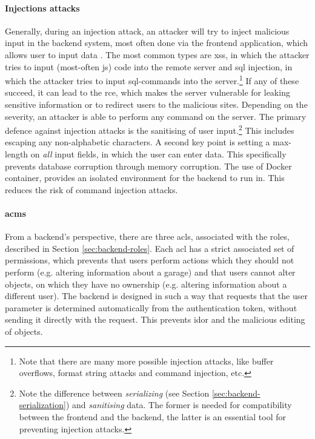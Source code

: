 \paragraph{Injections attacks}
Generally, during an injection attack, an attacker will try to inject malicious input in the backend system, most often done via the frontend application, which allows user to input data \cite{injection_attacks}. The most common types are \ac{xss}, in which the attacker tries to input (most-often \ac{js}) code into the remote server and \ac{sql} injection, in which the attacker tries to input \ac{sql}-commands into the server.\footnote{Note that there are many more possible injection attacks, like buffer overflows, format string attacks and command injection, etc.} If any of these succeed, it can lead to the \ac{rce}, which makes the server vulnerable for leaking sensitive information or to redirect users to the malicious sites. Depending on the severity, an attacker is able to perform any command on the server. The primary defence  against injection attacks is the sanitising of user input.\footnote{Note the difference between \textit{serializing} (see Section \ref{sec:backend-serialization}) and \textit{sanitising} data.  The former is needed for compatibility between the frontend and the backend, the latter is an essential tool for preventing injection attacks.} This includes escaping any non-alphabetic characters. A second key point is setting a max-length on \textit{all} input fields, in which the user can enter data. This specifically prevents database corruption through memory corruption. The use of Docker container, provides an isolated environment for the backend to run in. This reduces the risk of command injection attacks.

\paragraph{\acp{acm}}
From a backend's perspective, there are three \acp{acl}, associated with the roles, described in Section \ref{sec:backend-roles}. Each \ac{acl} has a strict associated set of permissions, which prevents that users perform actions which they should not perform (e.g. altering information about a garage) and that users cannot alter objects, on which they have no ownership (e.g. altering information about a different user). The backend is designed in such a way that requests that the user parameter is determined automatically from the authentication token, without sending it directly with the request. This prevents \ac{idor} and the malicious editing of objects. 

